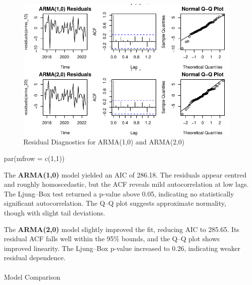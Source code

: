 \documentclass[
  11pt,
]{article}
\makeatletter
\let\oldparagraph\paragraph
\renewcommand{\paragraph}{
    \@ifstar
      \xxxParagraphStar
      \xxxParagraphNoStar
  }
\newcommand{\xxxParagraphStar}[1]{\oldparagraph*{#1}\mbox{}}
\newcommand{\xxxParagraphNoStar}[1]{\oldparagraph{#1}\mbox{}}
\newenvironment{Shaded}{\begin{snugshade}}{\end{snugshade}}
\newcommand{\AttributeTok}[1]{\textcolor[rgb]{0.40,0.45,0.13}{#1}}
\newcommand{\DecValTok}[1]{\textcolor[rgb]{0.68,0.00,0.00}{#1}}
\newcommand{\FunctionTok}[1]{\textcolor[rgb]{0.28,0.35,0.67}{#1}}
\newcommand{\NormalTok}[1]{\textcolor[rgb]{0.00,0.23,0.31}{#1}}
\makeatother
\begin{document}
\begin{figure}[H]

{\centering \includegraphics{project_files/figure-pdf/fig-arma-diagnostics-1.pdf}

}

\caption{Residual Diagnostics for ARMA(1,0) and ARMA(2,0)}

\end{figure}%

\begin{Shaded}
\begin{Highlighting}[]
\FunctionTok{par}\NormalTok{(}\AttributeTok{mfrow =} \FunctionTok{c}\NormalTok{(}\DecValTok{1}\NormalTok{,}\DecValTok{1}\NormalTok{))}
\end{Highlighting}
\end{Shaded}

The \textbf{ARMA(1,0)} model yielded an AIC of 286.18. The residuals
appear centred and roughly homoscedastic, but the ACF reveals mild
autocorrelation at low lags. The Ljung--Box test returned a p-value
above 0.05, indicating no statistically significant autocorrelation. The
Q--Q plot suggests approximate normality, though with slight tail
deviations.

The \textbf{ARMA(2,0)} model slightly improved the fit, reducing AIC to
285.65. Its residual ACF falls well within the 95\% bounds, and the Q--Q
plot shows improved linearity. The Ljung--Box p-value increased to 0.26,
indicating weaker residual dependence.

\paragraph{Model Comparison}\label{model-comparison}
\end{document}
